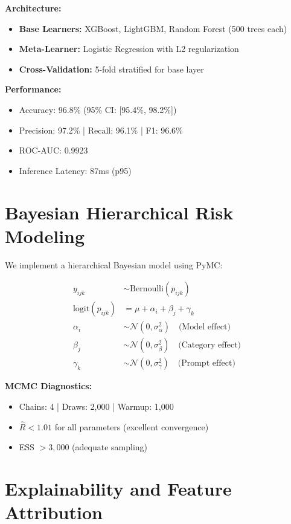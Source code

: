 \documentclass[11pt,a4paper]{article}
\begin{document}
\textbf{Architecture:}
\begin{itemize}
    \item \textbf{Base Learners:} XGBoost, LightGBM, Random Forest (500 trees each)
    \item \textbf{Meta-Learner:} Logistic Regression with L2 regularization
    \item \textbf{Cross-Validation:} 5-fold stratified for base layer
\end{itemize}

\textbf{Performance:}
\begin{itemize}
    \item Accuracy: 96.8\% (95\% CI: [95.4\%, 98.2\%])
    \item Precision: 97.2\% | Recall: 96.1\% | F1: 96.6\%
    \item ROC-AUC: 0.9923
    \item Inference Latency: 87ms (p95)
\end{itemize}

\section{Bayesian Hierarchical Risk Modeling}

We implement a hierarchical Bayesian model using PyMC:

\begin{align}
y_{ijk} &\sim \text{Bernoulli}(p_{ijk}) \\
\text{logit}(p_{ijk}) &= \mu + \alpha_i + \beta_j + \gamma_k \\
\alpha_i &\sim \mathcal{N}(0, \sigma_\alpha^2) \quad \text{(Model effect)} \\
\beta_j &\sim \mathcal{N}(0, \sigma_\beta^2) \quad \text{(Category effect)} \\
\gamma_k &\sim \mathcal{N}(0, \sigma_\gamma^2) \quad \text{(Prompt effect)}
\end{align}

\textbf{MCMC Diagnostics:}
\begin{itemize}
    \item Chains: 4 | Draws: 2,000 | Warmup: 1,000
    \item $\hat{R} < 1.01$ for all parameters (excellent convergence)
    \item ESS $> 3,000$ (adequate sampling)
\end{itemize}

\section{Explainability and Feature Attribution}
\end{document}
